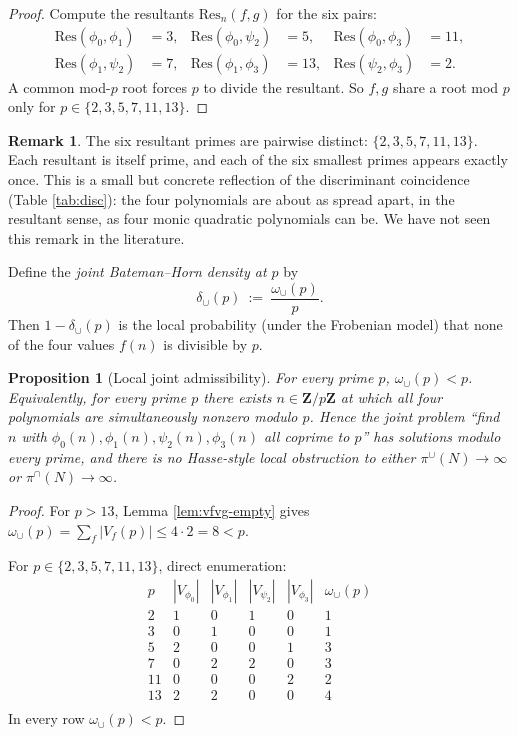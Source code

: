 \documentclass[11pt]{article}
\newtheorem{proposition}[theorem]{Proposition}
\theoremstyle{definition}
\newtheorem{remark}[theorem]{Remark}
\newcommand{\Z}{\mathbf{Z}}
\begin{document}
\begin{proof}
Compute the resultants $\mathrm{Res}_n(f,g)$ for the six pairs:
\begin{align*}
\mathrm{Res}(\phi_0,\phi_1)&=3,& \mathrm{Res}(\phi_0,\psi_2)&=5,& \mathrm{Res}(\phi_0,\phi_3)&=11,\\
\mathrm{Res}(\phi_1,\psi_2)&=7,& \mathrm{Res}(\phi_1,\phi_3)&=13,& \mathrm{Res}(\psi_2,\phi_3)&=2.
\end{align*}
A common mod-$p$ root forces $p$ to divide the resultant. So $f,g$ share a root mod $p$ only for $p\in\{2,3,5,7,11,13\}$.
\end{proof}

\begin{remark}\label{rem:res-distinct}
The six resultant primes are pairwise distinct: $\{2,3,5,7,11,13\}$. Each resultant is itself prime, and each of the six smallest primes appears exactly once. This is a small but concrete reflection of the discriminant coincidence (Table \ref{tab:disc}): the four polynomials are about as spread apart, in the resultant sense, as four monic quadratic polynomials can be. We have not seen this remark in the literature.
\end{remark}

Define the \emph{joint Bateman--Horn density at $p$} by
\[
\delta_\cup(p)\ :=\ \frac{\omega_\cup(p)}{p}.
\]
Then $1-\delta_\cup(p)$ is the local probability (under the Frobenian model) that none of the four values $f(n)$ is divisible by $p$.

\begin{proposition}[Local joint admissibility]\label{prop:admissible}
For every prime $p$, $\omega_\cup(p)<p$. Equivalently, for every prime $p$ there exists $n\in\Z/p\Z$ at which all four polynomials are simultaneously nonzero modulo $p$. Hence the joint problem ``find $n$ with $\phi_0(n),\phi_1(n),\psi_2(n),\phi_3(n)$ all coprime to $p$'' has solutions modulo every prime, and there is no Hasse-style local obstruction to either $\pi^\cup(N)\to\infty$ or $\pi^\cap(N)\to\infty$.
\end{proposition}

\begin{proof}
For $p>13$, Lemma \ref{lem:vfvg-empty} gives $\omega_\cup(p)=\sum_f|V_f(p)|\le 4\cdot 2 =8 < p$.

For $p\in\{2,3,5,7,11,13\}$, direct enumeration:
\[
\begin{array}{c|cccc|c}
p & |V_{\phi_0}| & |V_{\phi_1}| & |V_{\psi_2}| & |V_{\phi_3}| & \omega_\cup(p)\\
\hline
2 & 1 & 0 & 1 & 0 & 1\\
3 & 0 & 1 & 0 & 0 & 1\\
5 & 2 & 0 & 0 & 1 & 3\\
7 & 0 & 2 & 2 & 0 & 3\\
11 & 0 & 0 & 0 & 2 & 2\\
13 & 2 & 2 & 0 & 0 & 4\\
\end{array}
\]
In every row $\omega_\cup(p)<p$.
\end{proof}
\end{document}
